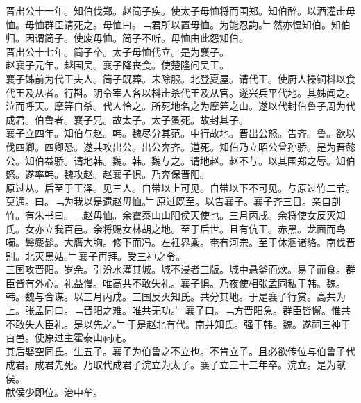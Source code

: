\documentclass{zhvt-classic}
\begin{document}
\hspace*{2em}晋出公十一年。知伯伐郑。赵简子疾。使太子毋恤将而围郑。知伯醉。以酒灌击毋恤。毋恤群臣请死之。毋恤曰。﹁君所以置毋恤。为能忍訽。﹂然亦愠知伯。知伯归。因谓简子。使废毋恤。简子不听。毋恤由此怨知伯。\\
\hspace*{2em}晋出公十七年。简子卒。太子毋恤代立。是为襄子。\\
\hspace*{2em}赵襄子元年。越围吴。襄子降丧食。使楚隆问吴王。\\
\hspace*{2em}襄子姊前为代王夫人。简子既葬。未除服。北登夏屋。请代王。使厨人操铜枓以食代王及从者。行斟。阴令宰人各以枓击杀代王及从官。遂兴兵平代地。其姊闻之。泣而呼天。摩笄自杀。代人怜之。所死地名之为摩笄之山。遂以代封伯鲁子周为代成君。伯鲁者。襄子兄。故太子。太子蚤死。故封其子。\\
\hspace*{2em}襄子立四年。知伯与赵。韩。魏尽分其范。中行故地。晋出公怒。告齐。鲁。欲以伐四卿。四卿恐。遂共攻出公。出公奔齐。道死。知伯乃立昭公曾孙骄。是为晋懿公。知伯益骄。请地韩。魏。韩。魏与之。请地赵。赵不与。以其围郑之辱。知伯怒。遂率韩。魏攻赵。赵襄子惧。乃奔保晋阳。\\
\hspace*{2em}原过从。后至于王泽。见三人。自带以上可见。自带以下不可见。与原过竹二节。莫通。曰。﹁为我以是遗赵毋恤。﹂原过既至。以告襄子。襄子齐三日。亲自剖竹。有朱书曰。﹁赵毋恤。余霍泰山山阳侯天使也。三月丙戌。余将使女反灭知氏。女亦立我百邑。余将赐女林胡之地。至于后世。且有伉王。赤黑。龙面而鸟噣。鬓麋髭。大膺大胸。修下而冯。左衽界乘。奄有河宗。至于休溷诸貉。南伐晋别。北灭黑姑。﹂襄子再拜。受三神之令。\\
\hspace*{2em}三国攻晋阳。岁余。引汾水灌其城。城不浸者三版。城中悬釜而炊。易子而食。群臣皆有外心。礼益慢。唯高共不敢失礼。襄子惧。乃夜使相张孟同私于韩。魏。韩。魏与合谋。以三月丙戌。三国反灭知氏。共分其地。于是襄子行赏。高共为上。张孟同曰。﹁晋阳之难。唯共无功。﹂襄子曰。﹁方晋阳急。群臣皆懈。惟共不敢失人臣礼。是以先之。﹂于是赵北有代。南并知氏。强于韩。魏。遂祠三神于百邑。使原过主霍泰山祠祀。\\
\hspace*{2em}其后娶空同氏。生五子。襄子为伯鲁之不立也。不肯立子。且必欲传位与伯鲁子代成君。成君先死。乃取代成君子浣立为太子。襄子立三十三年卒。浣立。是为献侯。\\
\hspace*{2em}献侯少即位。治中牟。\\
\end{document}
